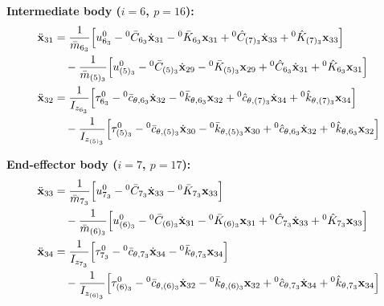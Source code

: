 \documentclass[11pt]{article}
\theoremstyle{definition}
\begin{document}
\textbf{Intermediate body ($i=6$, $p=16$):}
\begin{align}
    \ddot{\mathbf{x}}_{31} &= 
    \frac{1}{\bar{m}_{6_3}} \Big[ u^0_{6_3} - {}^0\bar{C}_{6_3}\dot{\mathbf{x}}_{31} - {}^0\bar{K}_{6_3}\mathbf{x}_{31} + {}^0\hat{C}_{(7)_3}\dot{\mathbf{x}}_{33} + {}^0\hat{K}_{(7)_3}\mathbf{x}_{33} \Big] \notag \\
    &\quad - \frac{1}{\bar{m}_{(5)_3}} \Big[ u^0_{(5)_3} - {}^0\bar{C}_{(5)_3}\dot{\mathbf{x}}_{29} - {}^0\bar{K}_{(5)_3}\mathbf{x}_{29} + {}^0\hat{C}_{6_3}\dot{\mathbf{x}}_{31} + {}^0\hat{K}_{6_3}\mathbf{x}_{31} \Big] \\
    \ddot{\mathbf{x}}_{32} &= 
    \frac{1}{I_{z_{6_3}}} \Big[ \tau^0_{6_3} - {}^0\bar{c}_{\theta,6_3}\dot{\mathbf{x}}_{32} - {}^0\bar{k}_{\theta,6_3}\mathbf{x}_{32} + {}^0\hat{c}_{\theta,(7)_3}\dot{\mathbf{x}}_{34} + {}^0\hat{k}_{\theta,(7)_3}\mathbf{x}_{34} \Big] \notag \\
    &\quad - \frac{1}{I_{z_{(5)_3}}} \Big[ \tau^0_{(5)_3} - {}^0\bar{c}_{\theta,(5)_3}\dot{\mathbf{x}}_{30} - {}^0\bar{k}_{\theta,(5)_3}\mathbf{x}_{30} + {}^0\hat{c}_{\theta,6_3}\dot{\mathbf{x}}_{32} + {}^0\hat{k}_{\theta,6_3}\mathbf{x}_{32} \Big]
\end{align}

\textbf{End-effector body ($i=7$, $p=17$):}
\begin{align}
    \ddot{\mathbf{x}}_{33} &= 
    \frac{1}{\bar{m}_{7_3}} \Big[ u^0_{7_3} - {}^0\bar{C}_{7_3}\dot{\mathbf{x}}_{33} - {}^0\bar{K}_{7_3}\mathbf{x}_{33} \Big] \notag \\
    &\quad - \frac{1}{\bar{m}_{(6)_3}} \Big[ u^0_{(6)_3} - {}^0\bar{C}_{(6)_3}\dot{\mathbf{x}}_{31} - {}^0\bar{K}_{(6)_3}\mathbf{x}_{31} + {}^0\hat{C}_{7_3}\dot{\mathbf{x}}_{33} + {}^0\hat{K}_{7_3}\mathbf{x}_{33} \Big] \\
    \ddot{\mathbf{x}}_{34} &= 
    \frac{1}{I_{z_{7_3}}} \Big[ \tau^0_{7_3} - {}^0\bar{c}_{\theta,7_3}\dot{\mathbf{x}}_{34} - {}^0\bar{k}_{\theta,7_3}\mathbf{x}_{34} \Big] \notag \\
    &\quad - \frac{1}{I_{z_{(6)_3}}} \Big[ \tau^0_{(6)_3} - {}^0\bar{c}_{\theta,(6)_3}\dot{\mathbf{x}}_{32} - {}^0\bar{k}_{\theta,(6)_3}\mathbf{x}_{32} + {}^0\hat{c}_{\theta,7_3}\dot{\mathbf{x}}_{34} + {}^0\hat{k}_{\theta,7_3}\mathbf{x}_{34} \Big]
\end{align}

\printbibliography
\end{document}
